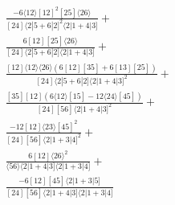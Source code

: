 \documentclass[varwidth, border=5pt]{standalone}
\begin{document}
\begin{my}
$\begin{gathered}
\scriptscriptstyle\frac{-6⟨12⟩[12]^2[25]⟨26⟩}{[24]⟨2|5+6|2]^2⟨2|1+4|3]}+\\
\scriptscriptstyle\frac{6[12][25]⟨26⟩}{[24]⟨2|5+6|2]⟨2|1+4|3]}+\\
\scriptscriptstyle\frac{[12]⟨12⟩⟨26⟩\scriptscriptstyle(6[12][35]+6[13][25])}{[24]⟨2|5+6|2]⟨2|1+4|3]^2}+\\
\scriptscriptstyle\frac{[35][12]\scriptscriptstyle(6⟨12⟩[15]-12⟨24⟩[45])}{[24][56]⟨2|1+4|3]^2}+\\
\scriptscriptstyle\frac{-12[12]⟨23⟩[45]^2}{[24][56]⟨2|1+3|4]^2}+\\
\scriptscriptstyle\frac{6[12]⟨26⟩^2}{⟨56⟩⟨2|1+4|3]⟨2|1+3|4]}+\\
\scriptscriptstyle\frac{-6[12][45]⟨2|1+3|5]}{[24][56]⟨2|1+4|3]⟨2|1+3|4]}\phantom{+}
\end{gathered}$
\end{my}
\end{document}
